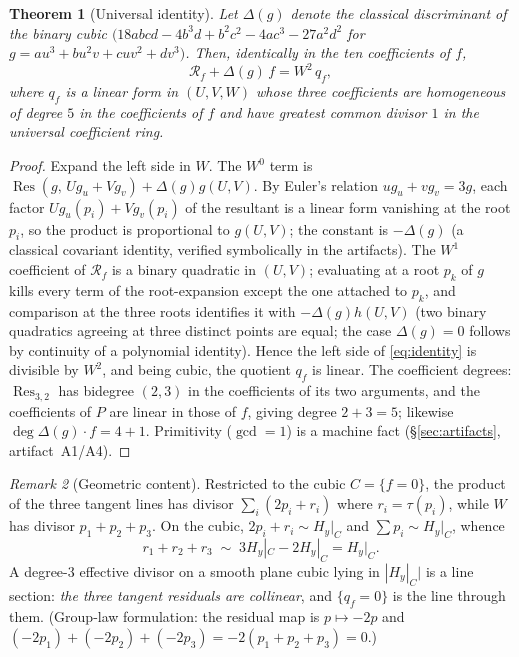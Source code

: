 \documentclass[11pt]{amsart}
\newtheorem{theorem}{Theorem}[section]
\theoremstyle{definition}
\theoremstyle{remark}
\newtheorem{remark}[theorem]{Remark}
\newcommand{\Res}{\operatorname{Res}}
\newcommand{\Hy}{H_y}
\newcommand{\calR}{\mathcal{R}}
\begin{document}
\begin{theorem}[Universal identity]\label{thm:identity}
Let $\Delta(g)$ denote the classical discriminant of the binary cubic
$(18abcd-4b^3d+b^2c^2-4ac^3-27a^2d^2$ for $g=au^3+bu^2v+cuv^2+dv^3)$.
Then, identically in the ten coefficients of $f$,
\begin{equation}\label{eq:identity}
\calR_f+\Delta(g)\,f=W^2\,q_f,
\end{equation}
where $q_f$ is a \emph{linear} form in $(U,V,W)$ whose three coefficients
are homogeneous of degree $5$ in the coefficients of $f$ and have greatest
common divisor $1$ in the universal coefficient ring.
\end{theorem}

\begin{proof}
Expand the left side in $W$.  The $W^0$ term is
$\Res(g,\,Ug_u+Vg_v)+\Delta(g)g(U,V)$.  By Euler's relation
$ug_u+vg_v=3g$, each factor $Ug_u(p_i)+Vg_v(p_i)$ of the resultant is a
linear form vanishing at the root $p_i$, so the product is proportional to
$g(U,V)$; the constant is $-\Delta(g)$ (a classical covariant identity,
verified symbolically in the artifacts).  The $W^1$ coefficient of
$\calR_f$ is a binary quadratic in $(U,V)$; evaluating at a root $p_k$ of
$g$ kills every term of the root-expansion except the one attached to
$p_k$, and comparison at the three roots identifies it with
$-\Delta(g)h(U,V)$ (two binary quadratics agreeing at three distinct
points are equal; the case $\Delta(g)=0$ follows by continuity of a
polynomial identity).  Hence the left side of \eqref{eq:identity} is
divisible by $W^2$, and being cubic, the quotient $q_f$ is linear.  The
coefficient degrees: $\Res_{3,2}$ has bidegree $(2,3)$ in the coefficients
of its two arguments, and the coefficients of $P$ are linear in those of
$f$, giving degree $2+3=5$; likewise $\deg\Delta(g)\cdot f=4+1$.
Primitivity ($\gcd=1$) is a machine fact
(\S\ref{sec:artifacts}, artifact~A1/A4).
\end{proof}

\begin{remark}[Geometric content]\label{rem:geom}
Restricted to the cubic $C=\{f=0\}$, the product of the three tangent
lines has divisor $\sum_i(2p_i+r_i)$ where $r_i=\tau(p_i)$, while $W$ has
divisor $p_1+p_2+p_3$.  On the cubic, $2p_i+r_i\sim \Hy|_C$ and
$\sum p_i\sim \Hy|_C$, whence
\[
r_1+r_2+r_3\;\sim\;3\Hy|_C-2\Hy|_C=\Hy|_C .
\]
A degree-$3$ effective divisor on a smooth plane cubic lying in $|\Hy|_C|$
is a line section: \emph{the three tangent residuals are collinear}, and
$\{q_f=0\}$ is the line through them.  (Group-law formulation: the
residual map is $p\mapsto-2p$ and
$(-2p_1)+(-2p_2)+(-2p_3)=-2(p_1+p_2+p_3)=0$.)
\end{remark}
\end{document}
